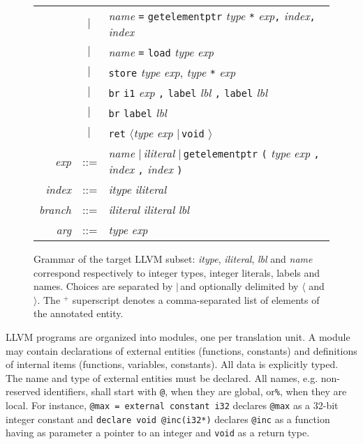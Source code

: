 \documentclass{llncs}
\newcommand{\llvm}[1]{\texttt{#1}}
\newcommand{\lalt}[0]{$\langle$\xspace}
\newcommand{\ralt}[0]{$\rangle$\xspace}
\newcommand{\alt}[0]{$\mid\,$}
\newcommand{\ListOf}[1]{$\mbox{#1}^+$}
\newcommand{\nt}[1]{{\normalfont\textit{#1}}}
\begin{document}
\begin{figure}
\begin{center}
\begin{tabular}{rcl}
      & \alt & \nt{name} \llvm{=} \llvm{getelementptr} \nt{type} \llvm{*} \nt{exp}\llvm{,} \nt{index}\llvm{,} \nt{index} \\
      & \alt & \nt{name} \llvm{=} \llvm{load} \nt{type} \nt{exp} \\
      & \alt & \llvm{store} \nt{type} \nt{exp}, \nt{type} \llvm{*} \nt{exp} \\
      & \alt & \llvm{br} \llvm{i1} \nt{exp} \llvm{,} \llvm{label} \nt{lbl} \llvm{,} \llvm{label} \nt{lbl} \\
      & \alt & \llvm{br} \llvm{label} \nt{lbl} \\
      & \alt & \llvm{ret} \lalt \nt{type} \nt{exp} \alt \llvm{void} \ralt \\
      \nt{exp} & ::= & \nt{name} \alt \nt{iliteral} \alt \llvm{getelementptr} \llvm{(} \nt{type} \nt{exp} \llvm{,} \nt{index} \llvm{,} \nt{index} \llvm{)} \\
      \nt{index} & ::= & \nt{itype} \nt{iliteral} \\
      \nt{branch} & ::= & \nt{iliteral} \nt{iliteral} \nt{lbl} \\
      \nt{arg} & ::= & \nt{type} \nt{exp}
    \end{tabular}
  \end{center}
  \caption{Grammar of the target LLVM subset: \nt{itype}, \nt{iliteral}, \nt{lbl}
    and \nt{name} correspond respectively to integer types, integer literals,
    labels and names. Choices are separated by \alt and optionally delimited by
    \lalt and \ralt.  The \ListOf{} superscript denotes a comma-separated list of
    elements of the annotated entity.}
  \label{fig:llvm-grammar}
\end{figure}

LLVM programs are organized into modules, one per translation unit. A module may
contain declarations of external entities (functions, constants) and definitions
of internal items (functions, variables, constants). All data is explicitly
typed. The name and type of external entities must be declared.  All names,
e.g. non-reserved identifiers, shall start with \llvm{@}, when they are global,
or\llvm{\%}, when they are local. For instance, \llvm{@max = external constant
  i32} declares \llvm{@max} as a 32-bit integer constant and \llvm{declare void
  @inc(i32*)} declares \llvm{@inc} as a function having as parameter a pointer
to an integer and \llvm{void} as a return type.
\end{document}
